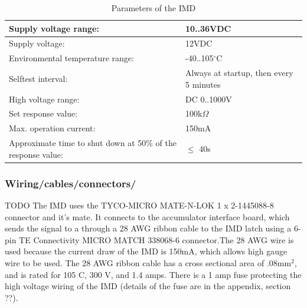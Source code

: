 \documentclass{article}
\begin{document}


\begin{center}
	\begin{table}[H]
		\begin{tabular}{|l|l|}
			\hline
			Supply voltage range: &  10..36VDC \\
			\hline
			Supply voltage: &  12VDC\\
			\hline
			Environmental temperature range: &  -40..105$^{\circ}$C \\
			\hline
			Selftest interval: &  Always at startup, then every 5 minutes \\
			\hline
			High voltage range: &  DC 0..1000V \\
			\hline
			Set response value: &  100k$\Omega$ \\
			\hline
			Max. operation current: &  150mA \\
			\hline
			Approximate time to shut down at 50\% of the response value:&  $\leq$ 40s \\
			\hline
		\end{tabular}
		\caption{Parameters of the IMD}
		\label{IMDParameters}
	\end{table}
\end{center}



\subsubsection{Wiring/cables/connectors/}
TODO
The  IMD uses the TYCO-MICRO MATE-N-LOK 1 x 2-1445088-8 connector and it's mate. It connects to the accumulator interface board, which sends the signal to a through a 28 AWG ribbon cable to the IMD latch using a 6-pin TE Connectivity MICRO MATCH 338068-6 connector.The 28 AWG wire is used because the current draw of the IMD is 150mA, which allows high gauge wire to be used. The 28 AWG ribbon cable has a cross sectional area of .08mm$^2$, and is rated for 105 \textdegree C, 300 V, and 1.4 amps. There is a 1 amp fuse protecting the high voltage wiring of the IMD (details of the fuse are in the appendix, section ??). %
\end{document}
